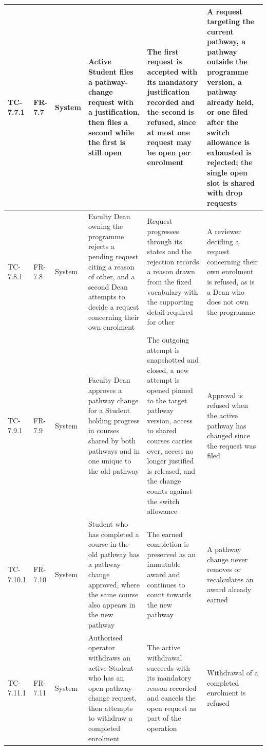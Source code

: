 \begin{longtable}{|>{\centering\arraybackslash}m{}|>{\centering\arraybackslash}m{}|>{\centering\arraybackslash}m{}|m{}|m{}|m{}|}
TC-7.7.1 & FR-7.7 & System & Active Student files a pathway-change request with a justification, then files a second while the first is still open & The first request is accepted with its mandatory justification recorded and the second is refused, since at most one request may be open per enrolment & A request targeting the current pathway, a pathway outside the programme version, a pathway already held, or one filed after the switch allowance is exhausted is rejected; the single open slot is shared with drop requests \\ \hline

TC-7.8.1 & FR-7.8 & System & Faculty Dean owning the programme rejects a pending request citing a reason of other, and a second Dean attempts to decide a request concerning their own enrolment & Request progresses through its states and the rejection records a reason drawn from the fixed vocabulary with the supporting detail required for other & A reviewer deciding a request concerning their own enrolment is refused, as is a Dean who does not own the programme \\ \hline

TC-7.9.1 & FR-7.9 & System & Faculty Dean approves a pathway change for a Student holding progress in courses shared by both pathways and in one unique to the old pathway & The outgoing attempt is snapshotted and closed, a new attempt is opened pinned to the target pathway version, access to shared courses carries over, access no longer justified is released, and the change counts against the switch allowance & Approval is refused when the active pathway has changed since the request was filed \\ \hline

TC-7.10.1 & FR-7.10 & System & Student who has completed a course in the old pathway has a pathway change approved, where the same course also appears in the new pathway & The earned completion is preserved as an immutable award and continues to count towards the new pathway & A pathway change never removes or recalculates an award already earned \\ \hline

TC-7.11.1 & FR-7.11 & System & Authorised operator withdraws an active Student who has an open pathway-change request, then attempts to withdraw a completed enrolment & The active withdrawal succeeds with its mandatory reason recorded and cancels the open request as part of the operation & Withdrawal of a completed enrolment is refused \\ \hline


\end{longtable}
